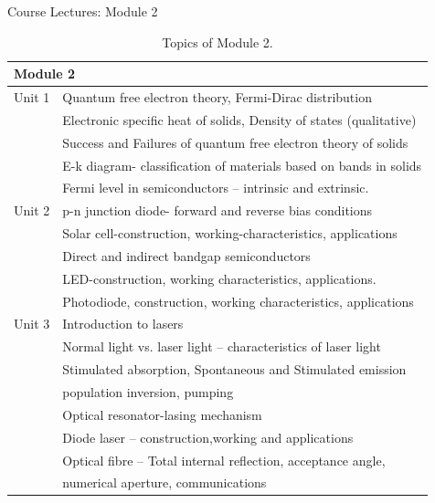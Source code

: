 %
%
\begin{frame}{Course Lectures: Module 2}
	
	{
		\tiny
		
		\begin{table}
			\begin{tabular}{ll}
				\toprule
				\multicolumn{2}{l}{Module 2}	\\
				\midrule
				Unit 1 & Quantum free electron theory, Fermi-Dirac distribution\\
				& Electronic specific heat of solids, Density of states (qualitative) \\
				& Success and Failures of quantum free electron theory of solids \\
				& E-k diagram- classification of materials based on bands in solids \\
				& Fermi level in semiconductors -- intrinsic and extrinsic. \\
				Unit 2 & p-n junction diode- forward and reverse bias conditions \\
				& Solar cell-construction, working-characteristics, applications \\
				& Direct and indirect bandgap semiconductors \\
				& LED-construction, working characteristics,  applications.	\\
				& Photodiode, construction, working characteristics, applications \\
				Unit 3 & Introduction to lasers \\
				& Normal light vs. laser light -- characteristics of laser light \\
				& Stimulated absorption, Spontaneous and Stimulated emission \\
				& population inversion, pumping \\
				& Optical resonator-lasing mechanism	\\
				& Diode laser -- construction,working and applications \\
				& Optical fibre -- Total internal reflection, acceptance angle, \\
				& numerical aperture, communications	\\
				\bottomrule
			\end{tabular}
			\caption{Topics of Module 2.}
		\end{table}
	}
\end{frame}
%
